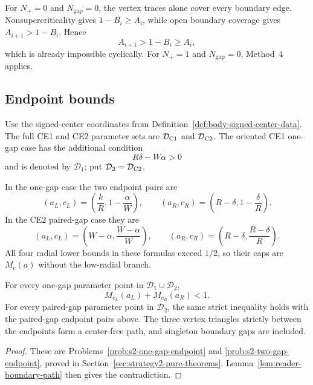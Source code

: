 For $N_+=0$ and $N_{\mathrm{gap}}=0$, the vertex traces alone cover every
boundary edge.  Nonsupercriticality gives $1-B_i\ge A_i$, while open boundary
coverage gives $A_{i+1}>1-B_i$.  Hence
\[
 A_{i+1}>1-B_i\ge A_i,
\]
which is already impossible cyclically.  For $N_+=1$ and
$N_{\mathrm{gap}}=0$, Method~4 applies.

\subsection{Endpoint bounds}

\begin{definition}
\label{def:body-strategy2-signed-domains}
\label{def:body-gap-endpoint-data}
Use the signed-center coordinates from Definition~\ref{def:body-signed-center-data}.
The full CE1 and CE2 parameter sets are $\mathcal D_{\rm C1}$ and
$\mathcal D_{\rm C2}$.  The oriented CE1 one-gap case has the additional
condition
\[
 R\delta-W\alpha>0
\]
and is denoted by $\mathcal D_1$; put
$\mathcal D_2=\mathcal D_{\rm C2}$.

In the one-gap case the two endpoint pairs are
\[
 (a_L,c_L)=\left(\frac{k}{R},1-\frac{\alpha}{W}\right),
 \qquad
 (a_R,c_R)=\left(R-\delta,1-\frac{\delta}{R}\right).
\]
In the CE2 paired-gap case they are
\[
 (a_L,c_L)=\left(W-\alpha,\frac{W-\alpha}{W}\right),
 \qquad
 (a_R,c_R)=\left(R-\delta,\frac{R-\delta}{R}\right).
\]
All four radial lower bounds in these formulas exceed $1/2$, so their caps
are $M_c(a)$ without the low-radial branch.
\end{definition}

\begin{proposition}
\label{prop:body-all-vd0-endpoints}
For every one-gap parameter point in $\mathcal D_1\cup\mathcal D_2$,
\[
 M_{c_L}(a_L)+M_{c_R}(a_R)<1.
\]
For every paired-gap parameter point in $\mathcal D_2$, the same strict
inequality holds with the paired-gap endpoint pairs above.  The three vertex
triangles strictly between the endpoints form a center-free path, and
singleton boundary gaps are included.
\end{proposition}

\begin{proof}
These are Problems~\ref{prob:s2-one-gap-endpoint} and
\ref{prob:s2-two-gap-endpoint}, proved in
Section~\ref{sec:strategy2-pure-theorems}.  Lemma~\ref{lem:reader-boundary-path}
then gives the contradiction.
\end{proof}

